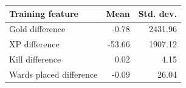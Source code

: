 \begin{tabular}{lrr}
\toprule
Training feature & Mean & Std. dev. \\
\midrule
Gold difference & -0.78 & 2431.96 \\
XP difference & -53.66 & 1907.12 \\
Kill difference & 0.02 & 4.15 \\
Wards placed difference & -0.09 & 26.04 \\
\bottomrule
\end{tabular}
